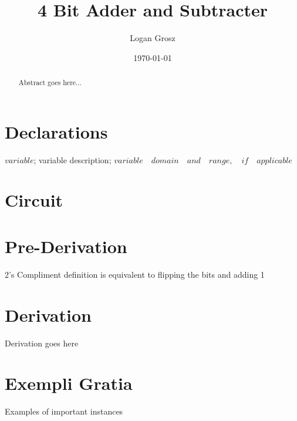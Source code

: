 \documentclass{article}
\begin{document}
	
\author{Logan Grosz}
\title{4 Bit Adder and Subtracter}
\date{\today}

\maketitle

\begin{abstract}
	Abstract goes here...
\end{abstract}

\section{Declarations}

$variable$; variable description; $variable\quad domain\quad and\quad range,\quad if\quad applicable$

\section{Circuit}


\section{Pre-Derivation}
2's Compliment definition is equivalent to flipping the bits and adding 1\\

\section{Derivation}

Derivation goes here

\section{Exempli Gratia}

Examples of important instances
\end{document}
